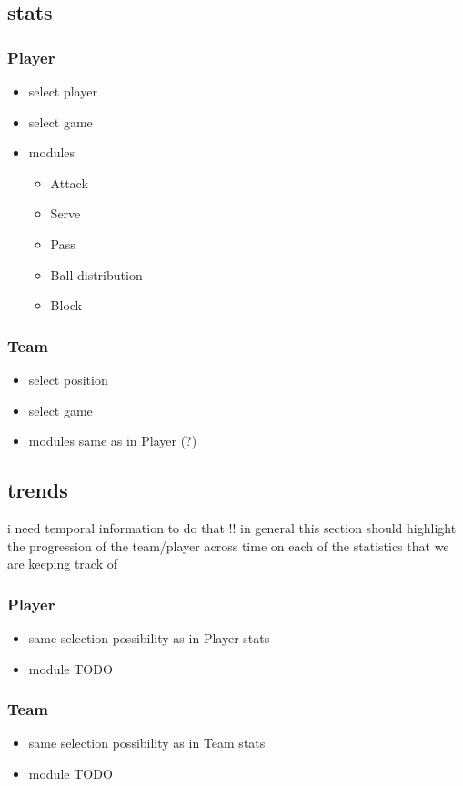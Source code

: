 \documentclass[11pt]{article}
\begin{document}
\subsection{stats}
\label{sec:orgf104969}
\subsubsection{Player}
\label{sec:org1975346}
\begin{itemize}
\item select player
\item select game
\item modules
  \begin{itemize}
  \item Attack
  \item Serve
  \item Pass
  \item Ball distribution
  \item Block
  \end{itemize}
\end{itemize}

\subsubsection{Team}
\label{sec:org2c5bee9}
\begin{itemize}
\item select position
\item select game
\item modules
  same as in Player (?)
\end{itemize}

\subsection{trends}
\label{sec:org6ed3af6}
i need temporal information to do that !!
in general this section should highlight the progression of the
team/player across time on each of the statistics that we are
keeping track of
\subsubsection{Player}
\label{sec:orga8a60b4}
\begin{itemize}
\item same selection possibility as in Player stats
\item module  TODO
\end{itemize}

\subsubsection{Team}
\label{sec:org450caec}
\begin{itemize}
\item same selection possibility as in Team stats
\item module TODO
\end{itemize}
\end{document}
